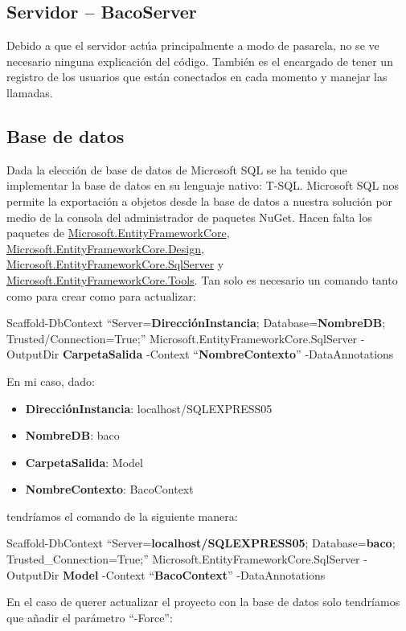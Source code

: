 \documentclass[12pt, a4paper]{book} %
\begin{document}
			\subsection{Servidor -- BacoServer}
			Debido a que el servidor actúa principalmente a modo de pasarela, no se ve necesario ninguna explicación del código. También es el encargado de tener un registro de los usuarios que están conectados en cada momento y manejar las llamadas.
			\subsection{Base de datos} \label{sbc:db}
			Dada la elección de base de datos de Microsoft SQL se ha tenido que implementar la base de datos en su lenguaje nativo: T-SQL. Microsoft SQL nos permite la exportación a objetos desde la base de datos a nuestra solución por medio de la consola del administrador de paquetes NuGet. Hacen falta los paquetes de \hyperlink{entity}{Microsoft.EntityFrameworkCore}, \hyperlink{entitydesign}{Microsoft.EntityFrameworkCore.Design}, \hyperlink{entityserver}{Microsoft.EntityFrameworkCore.SqlServer} y \hyperlink{entitytools}{Microsoft.EntityFrameworkCore.Tools}. Tan solo es necesario un comando tanto como para crear como para actualizar:
			\begin{center}
				\textsf{Scaffold-DbContext ``Server=\textbf{DirecciónInstancia}; Database=\textbf{NombreDB}; Trusted\slash Connection=True;'' Microsoft.EntityFrameworkCore.SqlServer -OutputDir \textbf{CarpetaSalida} -Context ``\textbf{NombreContexto}'' -DataAnnotations}
			\end{center}
			En mi caso, dado:
			\begin{itemize}
				\item \textbf{DirecciónInstancia}: localhost\slash SQLEXPRESS05
				\item \textbf{NombreDB}: baco
				\item \textbf{CarpetaSalida}: Model
				\item \textbf{NombreContexto}: BacoContext
			\end{itemize}
			tendríamos el comando de la siguiente manera:
			\begin{center}
				\textsf{Scaffold-DbContext ``Server=\textbf{localhost\slash SQLEXPRESS05}; Database=\textbf{baco}; Trusted\_Connection=True;'' Microsoft.EntityFrameworkCore.SqlServer -OutputDir \textbf{Model} -Context ``\textbf{BacoContext}'' -DataAnnotations}
			\end{center}
			En el caso de querer actualizar el proyecto con la base de datos solo tendríamos que añadir el parámetro ``-Force'':
\end{document}
